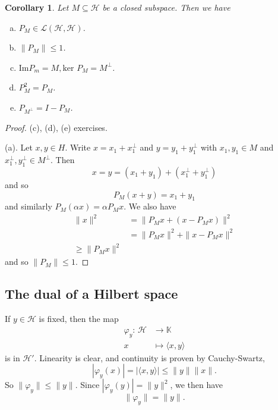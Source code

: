 \documentclass[12pt, oneside, a4paper]{article}
\newtheorem{cor}[thm]{Corollary}
\theoremstyle{dfn}
\def \ker {\text{ker }}
\newcommand{\mapping}[5]{\begin{align*}
    #1 : \,     #2 &\rightarrow #3 \\
            #4  &\mapsto #5
\end{align*}    
}
\renewcommand{\phi}{\varphi}
\newcommand{\K}{\mathbb{K}}
\newcommand{\Hil}{\mathcal{H}}
\begin{document}
\begin{cor}
    Let $M \subseteq \Hil$ be a closed subspace.  Then we have
    \begin{enumerate}[(a)]
        \item $P_M \in \mathcal{L}(\Hil, \Hil)$.
        \item $\| P_M \| \leq 1$.
        \item $\text{Im}P_m = M, \ker P_M = M^\perp$.
        \item $P^2_M = P_M$.
        \item $P_{M^\perp} = I - P_M$.
    \end{enumerate} 
\end{cor}
\begin{proof}
    (c), (d), (e) exercises.  
    
    (a).  Let $x,y \in H$.  Write $x = x_1 + x^\perp_1$ and $y = y_1 + y_1^\perp$ with $x_1, y_1 \in M$ and $x_1^\perp, y_1^\perp \in M^\perp$.  Then \[
        x = y = (x_1 + y_1) + (x^\perp_1 + y^\perp_1)
    \] and so \[
        P_M(x+y) = x_1 + y_1
    \] and similarly $P_M(\alpha x) = \alpha P_M x$.  We also have 
    \begin{align*}
        \| x \|^2   &= \|P_M x + (x - P_M x) \|^2 \\
                    &= \| P_M x \|^2 + \| x - P_M x \|^2 \\
                    \geq  \| P_M x \|^2 
    \end{align*} and so $\| P_M \| \leq 1$.  
\end{proof}

\subsection{The dual of a Hilbert space} %
\label{sub:the_dual_of_a_hilbert_space}

If $y \in \Hil$ is fixed, then the map \mapping{\phi_y}{\Hil}{\K}{x}{\langle x, y \rangle} is in $\Hil'$.  Linearity is clear, and continuity is proven by Cauchy-Swartz, \[
    | \phi_y(x) | = | \langle x, y \rangle | \leq \| y \| \| x \|.
\] So $\| \phi_y \| \leq \| y \|$. Since $|\phi_y(y)| = \| y \|^2$, we then have \[
    \| \phi_y \| = \| y \|.
\]
\end{document}
